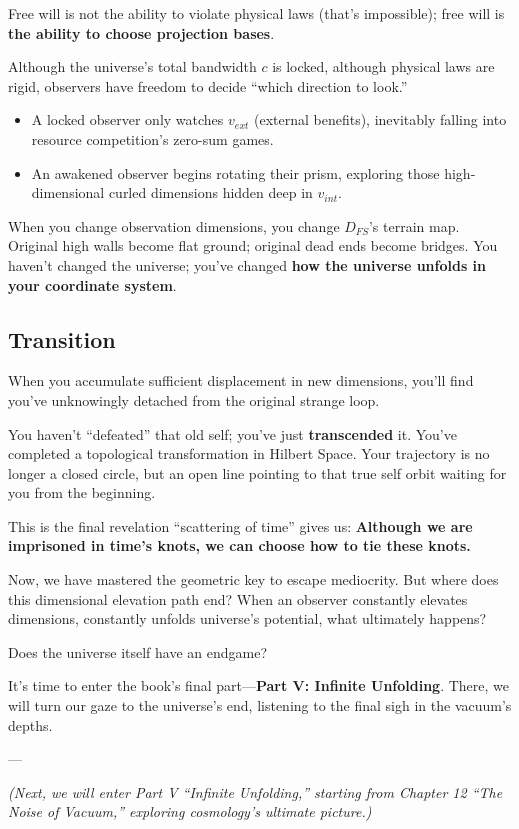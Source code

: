 Free will is not the ability to violate physical laws (that's impossible); free will is \textbf{the ability to choose projection bases}.

Although the universe's total bandwidth $c$ is locked, although physical laws are rigid, observers have freedom to decide ``which direction to look.''

\begin{itemize}
\item A locked observer only watches $v_{ext}$ (external benefits), inevitably falling into resource competition's zero-sum games.

\item An awakened observer begins rotating their prism, exploring those high-dimensional curled dimensions hidden deep in $v_{int}$.
\end{itemize}

When you change observation dimensions, you change $D_{FS}$'s terrain map. Original high walls become flat ground; original dead ends become bridges. You haven't changed the universe; you've changed \textbf{how the universe unfolds in your coordinate system}.

\subsection{Transition}

When you accumulate sufficient displacement in new dimensions, you'll find you've unknowingly detached from the original strange loop.

You haven't ``defeated'' that old self; you've just \textbf{transcended} it. You've completed a topological transformation in Hilbert Space. Your trajectory is no longer a closed circle, but an open line pointing to that true self orbit waiting for you from the beginning.

This is the final revelation ``scattering of time'' gives us: \textbf{Although we are imprisoned in time's knots, we can choose how to tie these knots.}

Now, we have mastered the geometric key to escape mediocrity. But where does this dimensional elevation path end? When an observer constantly elevates dimensions, constantly unfolds universe's potential, what ultimately happens?

Does the universe itself have an endgame?

It's time to enter the book's final part---\textbf{Part V: Infinite Unfolding}. There, we will turn our gaze to the universe's end, listening to the final sigh in the vacuum's depths.

---

\textit{(Next, we will enter Part V ``Infinite Unfolding,'' starting from Chapter 12 ``The Noise of Vacuum,'' exploring cosmology's ultimate picture.)}

